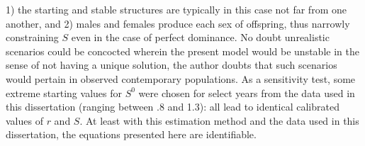   1) the starting and stable structures are typically in this
  case not far from one another, and 2) males and females produce each sex of
  offspring, thus narrowly constraining $S$ even in the case of
  perfect dominance. No doubt unrealistic scenarios could be concocted wherein
  the present model would be unstable in the sense of not having a unique 
  solution, the author doubts that
  such scenarios would pertain in observed contemporary populations. As a
  sensitivity test, some extreme starting values for $S^0$ were chosen for
  select years from the data used in this dissertation (ranging between .8 and
  1.3): all lead to identical calibrated values of $r$ and $S$. At least with
  this estimation method and the data used in this dissertation, the equations
  presented here are identifiable.

